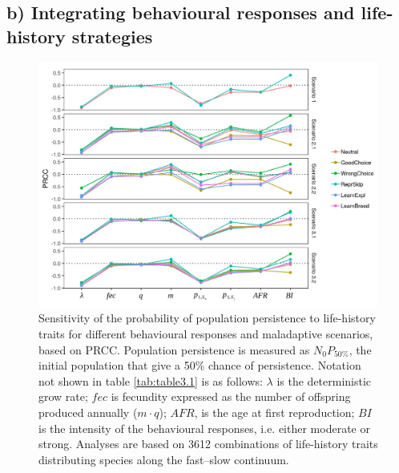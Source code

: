 \subsection*{b) Integrating behavioural responses and life-history strategies}

\begin{figure}
\centering
\includegraphics[width=\textwidth]{./Figures/chapter03/Fig_2.jpg}
\caption[Sensitivity of $N_{0}P_{50\%}$]{
Sensitivity of the probability of population persistence to life-history traits for different behavioural responses and maladaptive scenarios, based on PRCC.
Population persistence is measured as $N_{0}P_{50\%}$, the initial population that give a 50\% chance of persistence. Notation not shown in table \ref{tab:table3.1} is as follows: $\lambda$ is the
deterministic grow rate; $fec$ is fecundity expressed as the number of offspring produced annually ($m \cdot q$); $AFR$, is the age at first reproduction; $BI$ is the intensity of the behavioural
responses, i.e. either moderate or strong. Analyses are based on 3612 combinations of life-history traits distributing species along the fast–slow continuum.}
\label{fig:fig3.2}
\end{figure}

